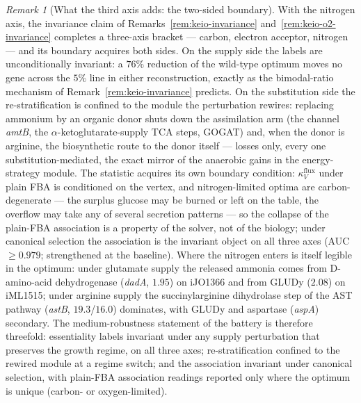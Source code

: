 \documentclass[11pt,a4paper]{article}
\theoremstyle{plain}
\theoremstyle{definition}
\theoremstyle{remark}
\newtheorem{remark}[theorem]{Remark}
\begin{document}
\begin{remark}[What the third axis adds: the two-sided boundary]
\label{rem:keio-n-invariance}
With the nitrogen axis, the invariance claim of
Remarks~\ref{rem:keio-invariance} and~\ref{rem:keio-o2-invariance}
completes a three-axis bracket --- carbon, electron acceptor,
nitrogen --- and its boundary acquires both sides. On the supply
side the labels are unconditionally invariant: a $76\%$ reduction
of the wild-type optimum moves no gene across the $5\%$ line in
either reconstruction, exactly as the bimodal-ratio mechanism of
Remark~\ref{rem:keio-invariance} predicts. On the substitution
side the re-stratification is confined to the module the
perturbation rewires: replacing ammonium by an organic donor shuts
down the assimilation arm (the channel \emph{amtB}, the
$\alpha$-ketoglutarate-supply TCA steps, GOGAT) and, when the donor
is arginine, the biosynthetic route to the donor itself --- losses
only, every one substitution-mediated, the exact mirror of the
anaerobic gains in the energy-strategy module. The statistic
acquires its own boundary condition:
$\kappa^{\mathrm{flux}}_V$ under plain FBA is conditioned on the
vertex, and nitrogen-limited optima are carbon-degenerate --- the
surplus glucose may be burned or left on the table, the overflow
may take any of several secretion patterns --- so the collapse of
the plain-FBA association is a property of the solver, not of the
biology; under canonical selection the association is the invariant
object on all three axes (AUC $\ge 0.979$; strengthened at the
baseline). Where the nitrogen enters is itself legible in the
optimum: under glutamate supply the released ammonia comes from
D-amino-acid dehydrogenase (\emph{dadA}, $1.95$) on iJO1366 and
from GLUDy ($2.08$) on iML1515; under arginine supply the
succinylarginine dihydrolase step of the AST pathway (\emph{astB},
$19.3$/$16.0$) dominates, with GLUDy and aspartase (\emph{aspA})
secondary. The medium-robustness statement of the battery is
therefore threefold: essentiality labels invariant under any supply
perturbation that preserves the growth regime, on all three axes;
re-stratification confined to the rewired module at a regime
switch; and the association invariant under canonical selection,
with plain-FBA association readings reported only where the optimum
is unique (carbon- or oxygen-limited).
\end{remark}
\end{document}
